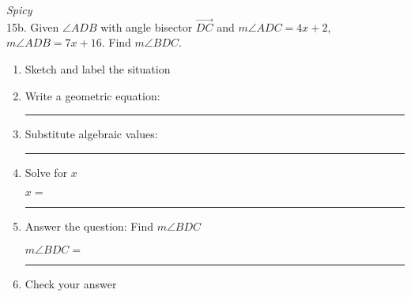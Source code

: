 \documentclass[12pt, oneside]{article}
\begin{document}
    \newpage
    \setcounter{page}{5}
      \emph{Spicy}\\
      15b. Given $\angle ADB$ with angle bisector $\overrightarrow{DC}$ and $m\angle ADC = 4x+2$, $m\angle ADB = 7x+16$. Find $m\angle BDC$.  %
      \begin{enumerate}
        \item Sketch and label the situation
        \begin{flushright}
        \end{flushright}
        \vspace{.5cm}

        \item Write a geometric equation: \rule{5cm}{0.15mm} \vspace{1cm}
        \item Substitute algebraic values: \rule{5cm}{0.15mm}
        \item Solve for $x$
        \vspace{4cm}
        \begin{center} $x=$ \rule{1cm}{0.15mm} \end{center}
        \item Answer the question: Find $m\angle BDC$ %
        \vspace{2cm}
        \begin{center} $m\angle BDC=$ \rule{1cm}{0.15mm} \end{center}
        \item Check your answer
      \end{enumerate}
      \vspace{2cm}
\end{document}
